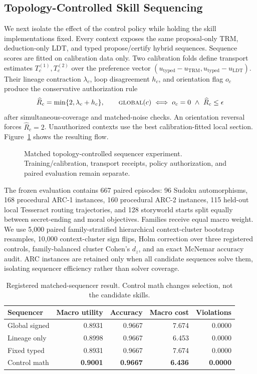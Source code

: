 \documentclass[11pt]{article}
\begin{document}
\subsection{Topology-Controlled Skill Sequencing}

We next isolate the effect of the control policy while holding the skill implementations fixed. Every context
exposes the same proposal-only TRM, deduction-only LDT, and typed propose/certify hybrid sequences. Sequence
scores are fitted on calibration data only. Two calibration folds define transport estimates
$T_c^{(1)},T_c^{(2)}$ over the preference vector
$(u_{\mathrm{typed}}-u_{\mathrm{TRM}},u_{\mathrm{typed}}-u_{\mathrm{LDT}})$. Their lineage contraction
$\lambda_c$, loop disagreement $h_c$, and orientation flag $o_c$ produce the conservative authorization rule
\[
  \widehat R_c=\min\{2,\lambda_c+h_c\},\qquad
  \textsc{global}(c)\iff o_c=0\ \land\ \widehat R_c\leq\epsilon
\]
after simultaneous-coverage and matched-noise checks. An orientation reversal forces $\widehat R_c=2$.
Unauthorized contexts use the best calibration-fitted local section. Figure~\ref{fig:sequencer-control} shows
the resulting flow.

\begin{figure}[t]
\centering
\resizebox{\textwidth}{!}{}
\caption{Matched topology-controlled sequencer experiment. Training/calibration, transport receipts, policy
authorization, and paired evaluation remain separate.}
\label{fig:sequencer-control}
\end{figure}

The frozen evaluation contains 667 paired episodes: 96 Sudoku automorphisms, 168 procedural ARC-1 instances,
160 procedural ARC-2 instances, 115 held-out local Tesseract routing trajectories, and 128 storyworld starts
split equally between secret-ending and moral objectives. Families receive equal macro weight. We use 5,000
paired family-stratified hierarchical context-cluster bootstrap resamples, 10,000 context-cluster sign flips,
Holm correction over three registered controls, family-balanced cluster Cohen's $d_z$, and an exact McNemar
accuracy audit. ARC instances are retained only when all candidate sequences solve them, isolating sequencer
efficiency rather than solver coverage.

\begin{table}[t]
\centering
\begin{tabular}{lrrrr}
\toprule
Sequencer & Macro utility & Accuracy & Macro cost & Violations \\
\midrule
Global signed & 0.8931 & 0.9667 & 7.674 & 0.0000 \\
Lineage only & 0.8998 & 0.9667 & 6.453 & 0.0000 \\
Fixed typed & 0.8931 & 0.9667 & 7.674 & 0.0000 \\
Control math & \textbf{0.9001} & \textbf{0.9667} & \textbf{6.436} & \textbf{0.0000} \\
\bottomrule
\end{tabular}
\caption{Registered matched-sequencer result. Control math changes selection, not the candidate skills.}
\label{tab:sequencer-control}
\end{table}
\end{document}

